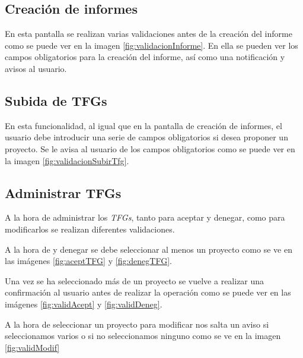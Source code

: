 \subsection{Creación de informes}

En esta pantalla se realizan varias validaciones antes de la creación del informe como se puede ver en la imagen \ref{fig:validacionInforme}.
En ella se pueden ver los campos obligatorios para la creación del informe, así como una notificación y avisos al usuario.


\subsection{Subida de TFGs}

En esta funcionalidad, al igual que en la pantalla de creación de informes, el usuario debe introducir una serie de campos obligatorios si desea proponer un proyecto. Se le avisa al usuario de los campos obligatorios como se puede ver en la imagen \ref{fig:validacionSubirTfg}.


\subsection{Administrar TFGs}
A la hora de administrar los \emph{TFGs}, tanto para aceptar y denegar, como para modificarlos se realizan diferentes validaciones.

A la hora de y denegar se debe seleccionar al menos un proyecto como se ve en las imágenes \ref{fig:aceptTFG} y \ref{fig:denegTFG}.


Una vez se ha seleccionado más de un proyecto se vuelve a realizar una confirmación al usuario antes de realizar la operación como se puede ver en las imágenes \ref{fig:validAcept} y \ref{fig:validDeneg}.


A la hora de seleccionar un proyecto para modificar nos salta un aviso si seleccionamos varios o si no seleccionamos ninguno como se ve en la imagen \ref{fig:validModif}

